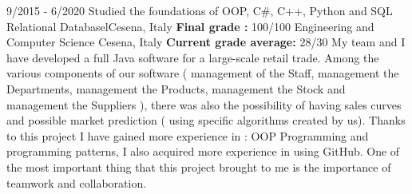 \documentclass[
    10pt,
    A4,
    english,
    draft = false,
    twoside = false,
]{article}
\begin{document}

	 {9/2015 - 6/2020}
	{Studied the foundations of OOP, C#, C++, Python and SQL Relational Databasel}{Cesena, Italy}
	{\textbf{Final grade :} 100/100}
	{Engineering and Computer Science }{Cesena, Italy}
	{\textbf{Current grade average:}  28/30}
	{My team and I have developed a full Java software for a large-scale retail trade. Among the various components of our software ( management of the Staff, management the Departments, management the Products, management the Stock and management the Suppliers ), there was also the possibility of having sales curves and possible market prediction ( using specific algorithms created by us). Thanks to this project I have gained more experience in : OOP Programming and programming patterns, I also acquired more experience in using GitHub. One of the most important thing that this project brought to me is the importance of teamwork and collaboration.} 
\end{document}
